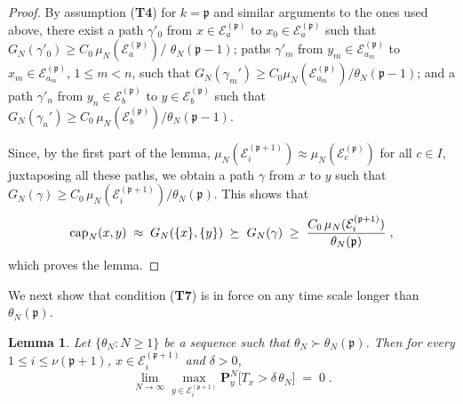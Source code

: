 \documentclass[reqno]{amsart}
\newtheorem{lemma}[theorem]{Lemma}
\begin{document}
\begin{proof}
By assumption ({\bf T4}) for $k={{\mathfrak p}}$ and similar arguments to the
ones used above, there exist a path $\gamma'_0$ from $x\in {{\mathcal E}}^{({{\mathfrak p}})}_a$ to $x_0\in {{\mathcal E}}^{({{\mathfrak p}})}_a$ such that $G_N(\gamma'_0) \ge
C_0\, \mu_N({{\mathcal E}}^{({{\mathfrak p}})}_{a})/$ $\theta_N({{\mathfrak p}}-1)$; paths
$\gamma'_m$ from $y_{m}\in {{\mathcal E}}^{({{\mathfrak p}})}_{a_{m}}$ to $x_{m}\in {{\mathcal E}}^{({{\mathfrak p}})}_{a_{m}}$, $1\le m<n$, such that $G_N(\gamma_m') \ge C_0
\mu_N({{\mathcal E}}^{({{\mathfrak p}})}_{a_m})/\theta_N({{\mathfrak p}}-1)$; and a path
$\gamma'_n$ from $y_n\in {{\mathcal E}}^{({{\mathfrak p}})}_b$ to $y\in {{\mathcal E}}^{({{\mathfrak p}})}_b$ such that $G_N(\gamma_n') \ge C_0\, \mu_N({{\mathcal E}}^{({{\mathfrak p}})}_b)/\theta_N({{\mathfrak p}}-1)$.

Since, by the first part of the lemma, $\mu_N({{\mathcal E}}^{({{\mathfrak p}} +1)}_i)
\approx \mu_N({{\mathcal E}}^{({{\mathfrak p}})}_c)$ for all $c\in I$, juxtaposing all
these paths, we obtain a path $\gamma$ from $x$ to $y$ such that
$G_N(\gamma) \ge C_0\, \mu_N({{\mathcal E}}^{({{\mathfrak p}} +1)}_i)/\theta_N({{\mathfrak p}})$. This shows that
\begin{equation*}
{{\rm cap}}_N(x,y) \;\approx\; G_N(\{x\},\{y\}) \;\succeq\; G_N(\gamma)
\;\ge\; \frac{C_0\, \mu_N({{\mathcal E}}^{({{\mathfrak p}} +1)}_i)}{\theta_N({{\mathfrak p}})}\; ,
\end{equation*}
which proves the lemma.
\end{proof}

We next show that condition ({\bf T7}) is in force on any time scale
longer than $\theta_N({{\mathfrak p}})$.

\begin{lemma}
\label{s17}
Let $\{\theta_N : N\ge 1\}$ be a sequence such that $\theta_N \succ
\theta_N ({{\mathfrak p}})$. Then for every $1\le i\le \nu({{\mathfrak p}} +1)$, $x\in {{\mathcal E}}^{({{\mathfrak p}}+1)}_i$ and $\delta>0$,
\begin{equation*}
\lim_{N\to \infty} \max_{y\in {{\mathcal E}}^{({{\mathfrak p}}+1)}_i} {{\mathbf P}}^N_y \big[
T_{x} > \delta \, \theta_N \big] \;=\; 0\;. 
\end{equation*}
\end{lemma}
\end{document}
